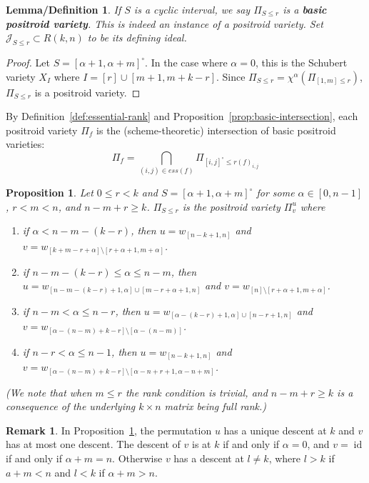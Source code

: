 \documentclass[12pt,reqno]{amsart}
\newtheorem{prop}[lemma]{Proposition}
\newtheorem{lem-def}[lemma]{Lemma/Definition}
\theoremstyle{definition}
\newtheorem{remark}[lemma]{Remark}
\newcommand{\id}{\operatorname{id}}
\newcommand{\cJ}{\mathcal{J}}
\begin{document}
{    
\begin{lem-def}
If $S$ is a cyclic interval,
we say $\Pi_{S\leq r}$ is a \textbf{basic positroid variety}. This is indeed an instance of a positroid variety. Set $\cJ_{S\leq r}\subset R(k,n)$ to be its defining ideal.
\end{lem-def}
\begin{proof}
    Let $S = [\alpha+1,\alpha+m]^\circ$. In the case where $\alpha = 0$, this is the Schubert variety $X_I$ where $I = [r]\cup [m+1,m+k-r]$.
    Since $\Pi_{S\leq r} = \chi^{\alpha}(\Pi_{[1,m]\leq r})$, $\Pi_{S\leq r}$ is a positroid variety.
\end{proof}
By Definition~\ref{def:essential-rank} and Proposition~\ref{prop:basic-intersection}, each positroid variety $\Pi_f$ is the (scheme-theoretic) intersection of basic positroid varieties:
\begin{equation}\label{eqn:basic-int}
    \Pi_f = \bigcap_{(i,j)\in ess(f)} \Pi_{[i,j]^\circ\leq r(f)_{i,j}}
\end{equation}


\begin{prop}\label{prop:uv}
    Let $0\le r<k$ and $S = [\alpha+1,\alpha+m]^\circ$ for some $\alpha\in [0,n-1]$, $r< m<n$, and $n-m+r\ge k$.  $\Pi_{S\leq r}$ is the positroid variety $\Pi_v^u$ where
    \begin{enumerate}
        \item if $\alpha< n-m-(k-r)$, then $u = w_{[n-k+1,n]}$ and $v = w_{[k+m-r+\alpha]\setminus [r+\alpha+1,m+\alpha]}$.
        \item if $n-m-(k-r)\leq \alpha \leq n-m$, then $u = w_{[n-m-(k-r)+1,\alpha]\cup[m-r+\alpha+1,n]}$ and $v = w_{[n]\setminus [r+\alpha+1,m+\alpha]}$.
        \item if $n-m<\alpha\leq n-r$, then $u = w_{[\alpha-(k-r)+1,\alpha]\cup [n-r+1,n]}$ and $v = w_{[\alpha-(n-m)+k-r]\setminus [\alpha-(n-m)]}$.
        \item if $n-r<\alpha\leq n-1$, then $u = w_{[n-k+1,n]}$ and $v = w_{[\alpha-(n-m)+k-r]\setminus [\alpha-n+r+1,\alpha-n+m]}$.
    \end{enumerate}
    (We note that when $m\le r$ the rank condition is trivial, and $n-m+r\ge k$ is a consequence of the underlying $k\times n$ matrix being full rank.)
\end{prop}


\begin{remark}
\label{rmk:uv-des}
  In Proposition~\ref{prop:uv}, the permutation $u$ has a unique descent at $k$ and $v$ has at most one descent. The descent of $v$ is at $k$ if and only if $\alpha=0$, and $v=\id$ if and only if $\alpha+m=n$. Otherwise $v$ has a descent at $l\neq k$, where $l>k$ if $a+m<n$ and $l<k$ if $\alpha+m>n$.
\end{remark}

}
\end{document}
